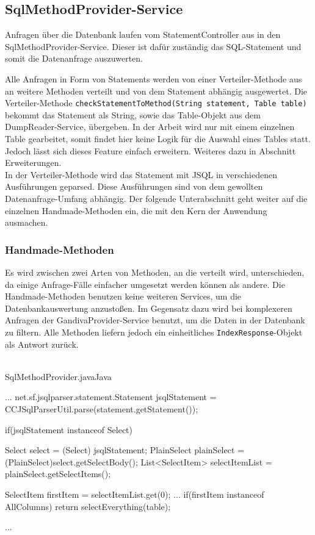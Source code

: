 \subsection{SqlMethodProvider-Service}
\label{SqlMethodProvider-Service}
Anfragen über die Datenbank laufen vom StatementController aus in den SqlMethodProvider-Service. Dieser ist dafür zuständig das SQL-Statement und somit die Datenanfrage auszuwerten.

Alle Anfragen in Form von Statements werden von einer Verteiler-Methode aus an weitere Methoden verteilt und von dem Statement abhängig ausgewertet.
Die Verteiler-Methode \texttt{checkStatementToMethod(String statement, Table table)} bekommt das Statement als String, sowie das Table-Objekt aus dem DumpReader-Service, übergeben. In der Arbeit wird nur mit einem einzelnen Table gearbeitet, somit findet hier keine Logik für die Auswahl eines Tables statt. Jedoch lässt sich dieses Feature einfach erweitern. Weiteres dazu in Abschnitt Erweiterungen.\\

In der Verteiler-Methode wird das Statement mit JSQL in verschiedenen Ausführungen geparsed. Diese Ausführungen sind von dem gewollten Datenanfrage-Umfang abhängig. Der folgende Unterabschnitt geht weiter auf die einzelnen Handmade-Methoden ein, die mit den Kern der Anwendung ausmachen.


\subsubsection{Handmade-Methoden}


Es wird zwischen zwei Arten von Methoden, an die verteilt wird, unterschieden, da einige Anfrage-Fälle einfacher umgesetzt werden können als andere.
Die Handmade-Methoden benutzen keine weiteren Services, um die Datenbankauswertung anzustoßen. Im Gegensatz dazu wird bei komplexeren Anfragen der GandivaProvider-Service benutzt, um die Daten in der Datenbank zu filtern.
Alle Methoden liefern jedoch ein einheitliches \texttt{IndexResponse}-Objekt als Antwort zurück.\\\\

\begin{codeblock}{SqlMethodProvider.java}{Java}
  \begin{javacode}
    ...
net.sf.jsqlparser.statement.Statement jsqlStatement = CCJSqlParserUtil.parse(statement.getStatement()); 

if(jsqlStatement instanceof Select) {

            Select select = (Select) jsqlStatement;
            PlainSelect plainSelect = (PlainSelect)select.getSelectBody();
            List<SelectItem> selectItemList = plainSelect.getSelectItems();

            SelectItem firstItem = selectItemList.get(0);
			...
            if(firstItem instanceof AllColumns){
                return selectEverything(table);
            }
}
    ...
  \end{javacode}
\end{codeblock}


